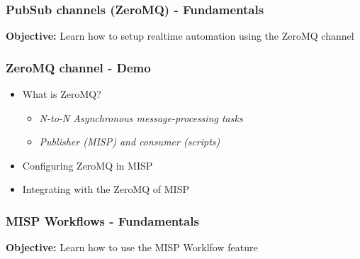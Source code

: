 \begin{frame}
    \frametitle{
        \huge
        PubSub channels (ZeroMQ) - Fundamentals
        \vspace{1em}
    }
    \textbf{Objective:} Learn how to setup realtime automation using the ZeroMQ channel
\end{frame}

\begin{frame}
    \frametitle{ZeroMQ channel - Demo}
    \begin{itemize}
        \item What is ZeroMQ?
        \begin{itemize}
            \item \textit{N-to-N Asynchronous message-processing tasks}
            \item \textit{Publisher (MISP) and consumer (scripts)}
        \end{itemize}
        \item Configuring ZeroMQ in MISP
        \item Integrating with the ZeroMQ of MISP
    \end{itemize}
\end{frame}

\begin{frame}
    \frametitle{
        \huge
        MISP Workflows - Fundamentals
        \vspace{1em}
    }
    \textbf{Objective:} Learn how to use the MISP Worklfow feature
\end{frame}

